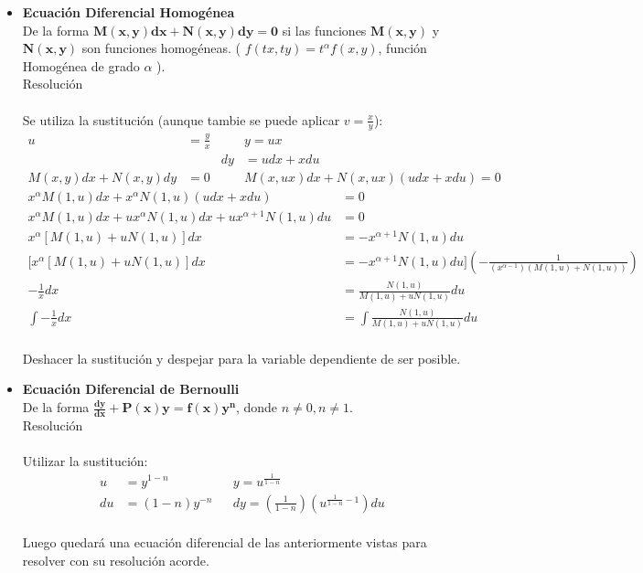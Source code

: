 \documentclass{article}
\begin{document}
\begin{itemize}
    \item \textbf{Ecuación Diferencial Homogénea} \\
    De la forma $\boldsymbol{M(x,y)dx + N(x,y)dy = 0}$ 
    si las funciones $\boldsymbol{M(x,y)}$ y $\boldsymbol{N(x,y)}$  son 
    funciones homogéneas. ( $f(tx,ty) = t^{\alpha}f(x,y)$, función Homogénea 
    de grado $\alpha$ ). \\
    Resolución \\
    \\Se utiliza la sustitución (aunque tambie se puede aplicar $v=\frac{x}{y}$): \\
    \begin{align*}
        u & = \frac{y}{x} && y = ux\\
        && dy & = udx + xdu \\
        M(x,y)dx + N(x,y)dy &= 0 && M(x,ux)dx + N(x,ux)(udx +xdu) = 0
    \end{align*}
    \begin{align*}
        x^{\alpha} M(1,u)dx + x^{\alpha} N(1,u)(udx + xdu) & = 0 \\
        x^{\alpha} M(1,u)dx + ux^{\alpha} N(1,u)dx + ux^{\alpha+1} N(1,u)du & = 0 \\
        x^{\alpha} [ M(1,u) + uN(1,u) ]dx & = -x^{\alpha+1}N(1,u)du \\
        [ x^{\alpha} [ M(1,u) + uN(1,u) ]dx & = -x^{\alpha+1}N(1,u)du ] (-\frac{1}{(x^{\alpha-1})(M(1,u)+N(1,u))}) \\
        -\frac{1}{x} dx & = \frac{N(1,u)}{M(1,u) + uN(1,u)}du \\
        \int -\frac{1}{x} dx & = \int \frac{N(1,u)}{M(1,u) + uN(1,u)}du
    \end{align*}
    \\Deshacer la sustitución y despejar para la variable dependiente de ser posible.\\

    \item \textbf{Ecuación Diferencial de Bernoulli} \\
    De la forma $\boldsymbol{\frac{dy}{dx} + P(x)y = f(x)y^n}$, donde 
    $n \neq 0, n \neq 1$. \\
    Resolución \\
    \\ Utilizar la sustitución: \\
    \begin{align*}
        u & = y^{1-n} && y = u^{\frac{1}{1-n}} \\
        du & = (1-n)y^{-n} && dy = (\frac{1}{1-n})(u^{\frac{1}{1-n}-1})du
    \end{align*}
    \\Luego quedará una ecuación diferencial de las anteriormente vistas para resolver con 
    su resolución acorde.
\end{itemize}
\end{document}
